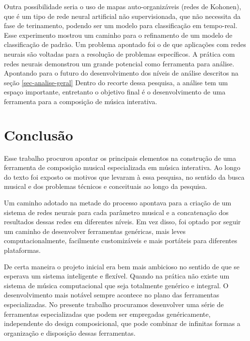 \documentclass{ppgmus}
\begin{document}
Outra possibilidade seria o uso de mapas auto-organizáveis (redes de Kohonen), que é
um tipo de rede neural artificial não supervisionada, que não necessita
da fase de terinamento, podendo ser um modelo para classificação em tempo-real.
Esse experimento mostrou um caminho para o refinamento de um modelo de classificação de padrão.
Um problema apontado foi o de que aplicações com redes neurais são voltadas
para a resolução de problemas específicos.
A prática com redes neurais demonstrou um grande potencial como ferramenta para análise. Apontando
para o futuro do desenvolvimento dos níveis de análise descritos na seção \ref{sec-analise-geral}
Dentro do recorte dessa pesquisa, a análise tem um espaço importante, entretanto o objetivo
final é o desenvolvimento de uma ferramenta para a composição de música interativa.








\section{Conclusão}


Esse trabalho procurou apontar os principais elementos na construção
de uma ferramenta de composição musical especializada em música 
interativa. Ao longo do texto foi exposto os motivos que levaram
à essa pesquisa, no sentido da busca musical e dos problemas
técnicos e conceituais ao longo da pesquisa.

 Um caminho adotado na metade do
processo apontava para a criação de um sistema de redes neurais 
para cada parâmetro musical e a concatenação dos resultados dessas redes
em diferentes níveis. Em vez disso, foi optado por seguir um caminho
de desenvolver ferramentas genéricas, mais leves computacionalmente,
facilmente customizáveis e mais portáteis para diferentes plataformas.

De certa maneira o projeto inicial era bem mais ambicioso no sentido
de que se esperava um sistema inteligente e flexível. 
Quando na prática
não existe um sistema de música computacional que seja totalmente genérico
e integral. O desenvolvimento mais notável sempre acontece no plano das ferramentas
especializadas. No presente trabalho procuramos desenvolver uma série
de ferramentas especializadas que podem ser empregadas genéricamente, independente
do design composicional, que pode combinar de infinitas formas a organização e 
disposição dessas ferramentas.  
\end{document}
